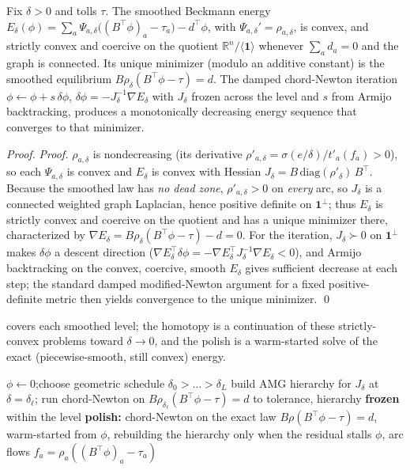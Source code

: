 \documentclass[ijoc]{informs3}
\newcommand{\R}{\mathbb{R}}
\begin{document}
\begin{proposition}\label{prop:conv}
Fix $\delta>0$ and tolls $\tau$. The smoothed Beckmann energy
$E_\delta(\phi)=\sum_a\Psi_{a,\delta}\big((B^\top\phi)_a-\tau_a\big)-d^\top\phi$, with
$\Psi_{a,\delta}'=\rho_{a,\delta}$, is convex, and strictly convex and coercive on the quotient
$\R^n/\langle\mathbf1\rangle$ whenever $\sum_a d_a=0$ and the graph is connected. Its unique minimizer (modulo an
additive constant) is the smoothed equilibrium $B\rho_\delta(B^\top\phi-\tau)=d$. The damped chord-Newton
iteration $\phi\leftarrow\phi+s\,\delta\phi$, $\delta\phi=-J_\delta^{-1}\nabla E_\delta$ with $J_\delta$ frozen
across the level and $s$ from Armijo backtracking, produces a monotonically decreasing energy sequence that
converges to that minimizer.
\end{proposition}
\begin{proof}{\it Proof.}
$\rho_{a,\delta}$ is nondecreasing (its derivative $\rho'_{a,\delta}=\sigma(e/\delta)/t'_a(f_a)>0$), so each
$\Psi_{a,\delta}$ is convex and $E_\delta$ is convex with Hessian $J_\delta=B\,\mathrm{diag}(\rho'_\delta)\,B^\top$.
Because the smoothed law has \emph{no dead zone}, $\rho'_{a,\delta}>0$ on \emph{every} arc, so $J_\delta$ is a
connected weighted graph Laplacian, hence positive definite on $\mathbf1^\perp$; thus $E_\delta$ is strictly
convex and coercive on the quotient and has a unique minimizer there, characterized by $\nabla E_\delta=
B\rho_\delta(B^\top\phi-\tau)-d=0$. For the iteration, $J_\delta\succ0$ on $\mathbf1^\perp$ makes
$\delta\phi$ a descent direction ($\nabla E_\delta^\top\delta\phi=-\nabla E_\delta^\top J_\delta^{-1}\nabla
E_\delta<0$), and Armijo backtracking on the convex, coercive, smooth $E_\delta$ gives sufficient decrease at each
step; the standard damped modified-Newton argument for a fixed positive-definite metric then yields convergence
to the unique minimizer. \qed
\end{proof}
 covers each smoothed level; the homotopy is a continuation of these strictly-convex problems
toward $\delta\to0$, and the polish is a warm-started solve of the exact (piecewise-smooth, still convex) energy.

\begin{algorithm}
\caption{Near-linear directed-UE solve (cold start)}\label{alg:solve}
\begin{algorithmic}[1]
\State $\phi\gets 0$;\quad choose geometric schedule $\delta_0>\dots>\delta_L$
 
  \State build AMG hierarchy for $J_\delta$ at $\delta=\delta_\ell$; run chord-Newton on
  $B\rho_{\delta_\ell}(B^\top\phi-\tau)=d$ to tolerance, hierarchy \textbf{frozen} within the level
\EndFor
\State \textbf{polish:} chord-Newton on the exact law $B\rho(B^\top\phi-\tau)=d$, warm-started from $\phi$,
rebuilding the hierarchy only when the residual stalls
\State \Return $\phi$, arc flows $f_a=\rho_a((B^\top\phi)_a-\tau_a)$
\end{algorithmic}
\end{algorithm}
\end{document}

